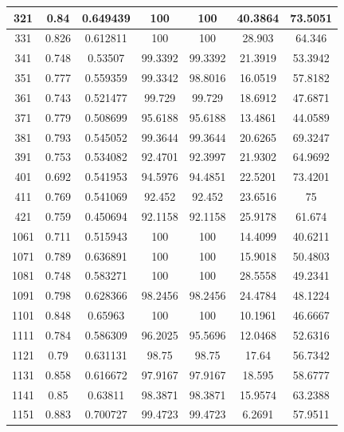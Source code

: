 \begin{appendices}
\begin{table}
\begin{tabular}{ |c|c|c|c|c|c|c| }
\hline
321 &  0.84 &  0.649439 &  100 &  100 &  40.3864 &  73.5051 \\
\hline
331 &  0.826 &  0.612811 &  100 &  100 &  28.903 &  64.346 \\
\hline
341 &  0.748 &  0.53507 &  99.3392 &  99.3392 &  21.3919 &  53.3942 \\
\hline
351 &  0.777 &  0.559359 &  99.3342 &  98.8016 &  16.0519 &  57.8182 \\
\hline
361 &  0.743 &  0.521477 &  99.729 &  99.729 &  18.6912 &  47.6871 \\
\hline
371 &  0.779 &  0.508699 &  95.6188 &  95.6188 &  13.4861 &  44.0589 \\
\hline
381 &  0.793 &  0.545052 &  99.3644 &  99.3644 &  20.6265 &  69.3247 \\
\hline
391 &  0.753 &  0.534082 &  92.4701 &  92.3997 &  21.9302 &  64.9692 \\
\hline
401 &  0.692 &  0.541953 &  94.5976 &  94.4851 &  22.5201 &  73.4201 \\
\hline
411 &  0.769 &  0.541069 &  92.452 &  92.452 &  23.6516 &  75 \\
\hline
421 &  0.759 &  0.450694 &  92.1158 &  92.1158 &  25.9178 &  61.674 \\
\hline
1061 &  0.711 &  0.515943 &  100 &  100 &  14.4099 &  40.6211 \\
\hline
1071 &  0.789 &  0.636891 &  100 &  100 &  15.9018 &  50.4803 \\
\hline
1081 &  0.748 &  0.583271 &  100 &  100 &  28.5558 &  49.2341 \\
\hline
1091 &  0.798 &  0.628366 &  98.2456 &  98.2456 &  24.4784 &  48.1224 \\
\hline
1101 &  0.848 &  0.65963 &  100 &  100 &  10.1961 &  46.6667 \\
\hline
1111 &  0.784 &  0.586309 &  96.2025 &  95.5696 &  12.0468 &  52.6316 \\
\hline
1121 &  0.79 &  0.631131 &  98.75 &  98.75 &  17.64 &  56.7342 \\
\hline
1131 &  0.858 &  0.616672 &  97.9167 &  97.9167 &  18.595 &  58.6777 \\
\hline
1141 &  0.85 &  0.63811 &  98.3871 &  98.3871 &  15.9574 &  63.2388 \\
\hline
1151 &  0.883 &  0.700727 &  99.4723 &  99.4723 &  6.2691 &  57.9511 \\
\hline
\end{tabular}

\end{table}


\end{appendices}
